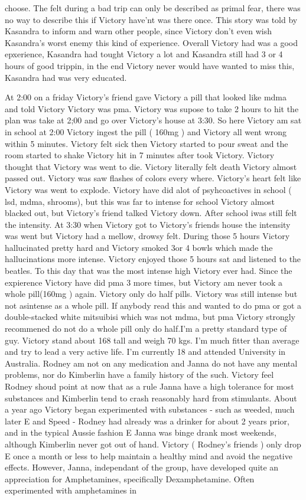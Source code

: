 \documentclass[12pt]{book}
\begin{document}
choose. The felt during a bad trip can only be described as primal fear, there was no way to describe this if Victory have'nt was there once. This story was told by Kasandra to inform and warn other people, since Victory don't even wish Kasandra's worst enemy this kind of experience. Overall Victory had was a good epxerience, Kasandra had tought Victory a lot and Kasandra still had 3 or 4 hours of good trippin, in the end Victory never would have wanted to miss this, Kasandra had was very educated.



At 2:00 on a friday Victory's friend gave Victory a pill that looked like mdma and told Victory Victory was pma. Victory was supose to take 2 hours to hit the plan was take at 2;00 and go over Victory's house at 3:30. So here Victory am sat in school at 2:00 Victory ingest the pill ( 160mg ) and Victory all went wrong within 5 minutes. Victory felt sick then Victory started to pour sweat and the room started to shake Victory hit in 7 minutes after took Victory. Victory thought that Victory was went to die. Victory literally felt death Victory almost passed out. Victory was saw flashes of colors every where. Victory's heart felt like Victory was went to explode. Victory have did alot of psyhcoactives in school ( lsd, mdma, shrooms), but this was far to intense for school Victory almost blacked out, but Victory's friend talked Victory down. After school iwas still felt the intensity. At 3:30 when Victory got to Victory's friends house the intensity was went but Victory had a mellow, drowsy felt. During those 5 hours Victory hallucinated pretty hard and Victory smoked 3or 4 bowls which made the hallucinations more intense. Victory enjoyed those 5 hours sat and listened to the beatles. To this day that was the most intense high Victory ever had. Since the expierence Victory have did pma 3 more times, but Victory am never took a whole pill(160mg ) again. Victory only do half pills. Victory was still intense but not asintense as a whole pill. If anybody read this and wanted to do pma or got a double-stacked white mitsuibisi which was not mdma, but pma Victory strongly recommened do not do a whole pill only do half.I'm a pretty standard type of guy. Victory stand about 168 tall and weigh 70 kgs. I'm much fitter than average and try to lead a very active life. I'm currently 18 and attended University in Australia. Rodney am not on any medication and Janna do not have any mental problems, nor do Kimberlin have a family history of the such. Victory feel Rodney shoud point at now that as a rule Janna have a high tolerance for most substances and Kimberlin tend to crash reasonably hard from stimulants. About a year ago Victory began experimented with substances - such as weeded, much later E and Speed - Rodney had already was a drinker for about 2 years prior, and in the typical Aussie fashion E Janna was binge drank most weekends, although Kimberlin never got out of hand. Victory ( Rodney's friends ) only drop E once a month or less to help maintain a healthy mind and avoid the negative effects. However, Janna, independant of the group, have developed quite an appreciation for Amphetamines, specifically Dexamphetamine. Often experimented with amphetamines in 
\end{document}
